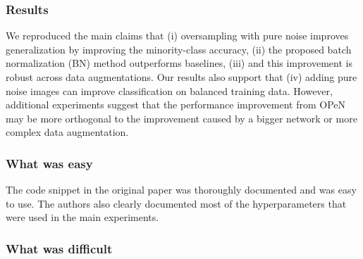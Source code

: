 \subsubsection*{Results}

We reproduced the main claims that (i) oversampling with pure noise improves generalization by improving the minority-class accuracy, (ii) the proposed batch normalization (BN) method outperforms baselines, (iii) and this improvement is robust across data augmentations. Our results also support that (iv) adding pure noise images can improve classification on balanced training data. However, additional experiments suggest that the performance improvement from OPeN may be more orthogonal to the improvement caused by a bigger network or more complex data augmentation.

\subsubsection*{What was easy}

The code snippet in the original paper was thoroughly documented and was easy to use. The authors also clearly documented most of the hyperparameters
that were used in the main experiments.

\subsubsection*{What was difficult}

 
